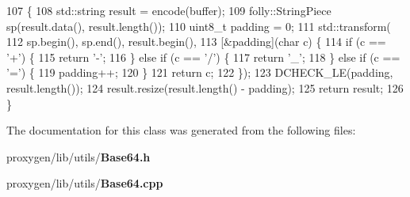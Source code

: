 \begin{DoxyCode}
107                                                  \{
108   std::string result = encode(buffer);
109   folly::StringPiece sp(result.data(), result.length());
110   uint8\_t padding = 0;
111   std::transform(
112     sp.begin(), sp.end(), result.begin(),
113     [&padding](\textcolor{keywordtype}{char} c) \{
114       \textcolor{keywordflow}{if} (c == \textcolor{charliteral}{'+'}) \{
115         \textcolor{keywordflow}{return} \textcolor{charliteral}{'-'};
116       \} \textcolor{keywordflow}{else} \textcolor{keywordflow}{if} (c == \textcolor{charliteral}{'/'}) \{
117         \textcolor{keywordflow}{return} \textcolor{charliteral}{'\_'};
118       \} \textcolor{keywordflow}{else} \textcolor{keywordflow}{if} (c == \textcolor{charliteral}{'='}) \{
119         padding++;
120       \}
121       \textcolor{keywordflow}{return} c;
122     \});
123   DCHECK\_LE(padding, result.length());
124   result.resize(result.length() - padding);
125   \textcolor{keywordflow}{return} result;
126 \}
\end{DoxyCode}


The documentation for this class was generated from the following files\+:\begin{DoxyCompactItemize}
\item 
proxygen/lib/utils/{\bf Base64.\+h}\item 
proxygen/lib/utils/{\bf Base64.\+cpp}\end{DoxyCompactItemize}
